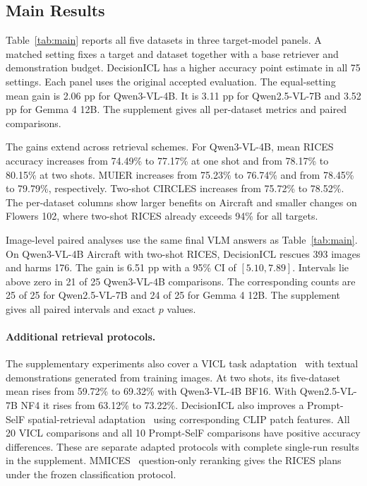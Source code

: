 \documentclass[10pt,twocolumn,letterpaper]{article}
\begin{document}
\subsection{Main Results}
\label{sec:mainresults}
Table~\ref{tab:main} reports all five datasets in three target-model panels. A matched setting fixes a target and dataset together with a base retriever and demonstration budget. DecisionICL has a higher accuracy point estimate in all 75 settings. Each panel uses the original accepted evaluation. The equal-setting mean gain is 2.06 pp for Qwen3-VL-4B. It is 3.11 pp for Qwen2.5-VL-7B and 3.52 pp for Gemma 4 12B. The supplement gives all per-dataset metrics and paired comparisons.

The gains extend across retrieval schemes. For Qwen3-VL-4B, mean RICES accuracy increases from 74.49\% to 77.17\% at one shot and from 78.17\% to 80.15\% at two shots. MUIER increases from 75.23\% to 76.74\% and from 78.45\% to 79.79\%, respectively. Two-shot CIRCLES increases from 75.72\% to 78.52\%. The per-dataset columns show larger benefits on Aircraft and smaller changes on Flowers 102, where two-shot RICES already exceeds 94\% for all targets.

Image-level paired analyses use the same final VLM answers as Table~\ref{tab:main}. On Qwen3-VL-4B Aircraft with two-shot RICES, DecisionICL rescues 393 images and harms 176. The gain is 6.51 pp with a 95\% CI of $[5.10,7.89]$. Intervals lie above zero in 21 of 25 Qwen3-VL-4B comparisons. The corresponding counts are 25 of 25 for Qwen2.5-VL-7B and 24 of 25 for Gemma 4 12B. The supplement gives all paired intervals and exact $p$ values.

\paragraph{Additional retrieval protocols.}
The supplementary experiments also cover a VICL task adaptation~\cite{vicl} with textual demonstrations generated from training images. At two shots, its five-dataset mean rises from 59.72\% to 69.32\% with Qwen3-VL-4B BF16. With Qwen2.5-VL-7B NF4 it rises from 63.12\% to 73.22\%. DecisionICL also improves a Prompt-SelF spatial-retrieval adaptation~\cite{promptself} using corresponding CLIP patch features. All 20 VICL comparisons and all 10 Prompt-SelF comparisons have positive accuracy differences. These are separate adapted protocols with complete single-run results in the supplement. MMICES~\cite{mmices} question-only reranking gives the RICES plans under the frozen classification protocol.
\end{document}
